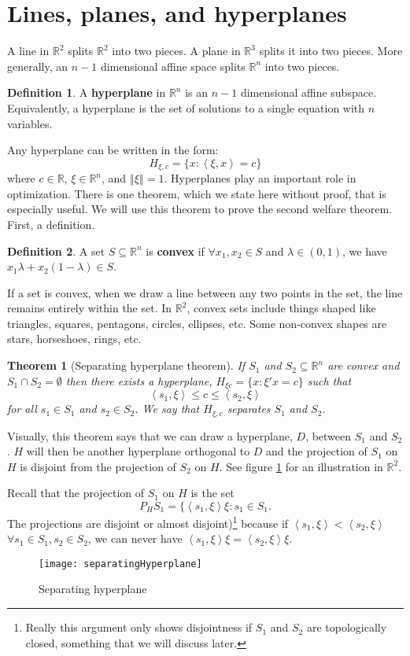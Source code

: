 \documentclass[12pt,reqno]{amsart}
\newtheorem{theorem}{Theorem}[section]
\theoremstyle{definition}
\newtheorem{definition}{Definition}[section]
\def\R{\mathbb{R}}
\newcommand{\iprod}[2]{\left\langle {#1} , {#2} \right\rangle}
\newcommand{\norm}[1]{\left\Vert {#1} \right\Vert}
\begin{document}
\section{Lines, planes, and hyperplanes }

A line in $\R^2$ splits $\R^2$ into two pieces. A plane in $\R^3$
splits it into two pieces. More generally, an $n-1$ dimensional
affine space splits $\R^n$ into two pieces.
\begin{definition}
  A \textbf{hyperplane} in $\R^n$ is an $n-1$ dimensional affine
  subspace. Equivalently, a hyperplane is the set of solutions to a
  single equation with $n$ variables.
\end{definition}
Any hyperplane can be written in the form:
\[ H_{\xi,c} = \{x: \iprod{\xi}{x} = c \} \] where $c \in \R$, $\xi \in
\R^n$, and $\norm{\xi} = 1$.  Hyperplanes play an important role in
optimization. There is one theorem, which we state here without proof,
that is especially useful.  We will use this theorem to prove the
second welfare theorem. First, a definition.
\begin{definition}
  A set $S \subseteq \R^n$ is \textbf{convex} if $\forall x_1, x_2 \in
  S$ and $\lambda \in (0,1)$, we have $x_1 \lambda + x_2(1-\lambda)
  \in S$.
\end{definition}
If a set is convex, when we draw a line between any two points in the
set, the line remains entirely within the set.  In $\R^2$, convex sets
include things shaped like triangles, squares, pentagons, circles,
ellipses, etc. Some non-convex shapes are stars, horseshoes, rings,
etc.

\begin{theorem}[Separating hyperplane theorem] \label{thm:sht}
  If $S_1$ and $S_2 \subseteq \R^n$ are convex and $S_1 \cap S_2 =
  \emptyset$ then there exists a hyperplane, $H_{\xi c} = \{ x: \xi'x
  = c \}$ such that  
  \[ \iprod{s_1}{\xi} \leq c \leq \iprod{s_2}{\xi} \]
  for all $s_1 \in S_1$ and $s_2 \in S_2$. We say that $H_{\xi,c}$
  separates $S_1$ and $S_2$. 
\end{theorem}
Visually, this theorem says that we can draw a hyperplane, $D$,
between $S_1$ and $S_2$. $H$ will then be another hyperplane
orthogonal to $D$ and the projection of $S_1$ on $H$ is disjoint from
the projection of $S_2$ on $H$. See figure \ref{fig:sht} for an
illustration in $\R^2$.

Recall that the projection of $S_1$ on $H$ is the set
\[ P_H S_1 = \{ \iprod{s_1}{\xi}\xi : s_1 \in S_1. \] The projections
are disjoint or almost disjoint)\footnote{Really this argument only
  shows disjointness if $S_1$ and $S_2$ are topologically
  closed, something that we will discuss later.} because if
$\iprod{s_1}{\xi} < \iprod{s_2}{\xi}$ $\forall s_1 \in S_1, s_2 \in
S_2$, we can never have $\iprod{s_1}{\xi}\xi = \iprod{s_2}{\xi}\xi $.
\begin{figure}\caption{Separating hyperplane \label{fig:sht}}
  \begin{centering}
    \texttt{[image: separatingHyperplane]}
  \end{centering}
\end{figure}
\end{document}
